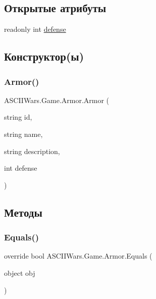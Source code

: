 \subsection*{Открытые атрибуты}
\begin{DoxyCompactItemize}
\item 
readonly int \hyperlink{class_a_s_c_i_i_wars_1_1_game_1_1_armor_ac056d4feeb6864656f00144af7a4ed8b}{defense}
\end{DoxyCompactItemize}


\subsection{Конструктор(ы)}
\hypertarget{class_a_s_c_i_i_wars_1_1_game_1_1_armor_a3286b25da22682e4773667888ee99cf9}{}\label{class_a_s_c_i_i_wars_1_1_game_1_1_armor_a3286b25da22682e4773667888ee99cf9} 
\subsubsection{\texorpdfstring{Armor()}{Armor()}}
{\footnotesize\ttfamily A\+S\+C\+I\+I\+Wars.\+Game.\+Armor.\+Armor (\begin{DoxyParamCaption}\item[{string}]{id,  }\item[{string}]{name,  }\item[{string}]{description,  }\item[{int}]{defense }\end{DoxyParamCaption})\hspace{0.3cm}{\ttfamily [inline]}}



\subsection{Методы}
\hypertarget{class_a_s_c_i_i_wars_1_1_game_1_1_armor_a2cb86fcb3169af675628bd2ab7e00036}{}\label{class_a_s_c_i_i_wars_1_1_game_1_1_armor_a2cb86fcb3169af675628bd2ab7e00036} 
\subsubsection{\texorpdfstring{Equals()}{Equals()}}
{\footnotesize\ttfamily override bool A\+S\+C\+I\+I\+Wars.\+Game.\+Armor.\+Equals (\begin{DoxyParamCaption}\item[{object}]{obj }\end{DoxyParamCaption})\hspace{0.3cm}{\ttfamily [inline]}}

